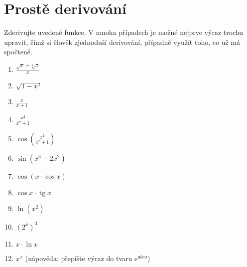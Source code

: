 \documentclass[12pt,a4paper]{article}
\DeclareMathOperator{\tg}{tg}
\def\ee{\mathrm{e}}
\begin{document}
\section*{Prostě derivování}


Zderivujte uvedené funkce. V mnoha případech je možné nejprve výraz trochu upravit, čímž si člověk zjednoduší derivování, případně využít toho, co už má spočtené.

\begin{enumerate}
	\everymath{\displaystyle}
	\parskip\bigskipamount
	\item $\frac{\sqrt x + \sqrt[3] x}{x}$
	\item $\sqrt{1-x^2}$
	\item $\frac{x}{x+1}$
	\item $\frac{x^2}{x^2+1}$
	\item $\cos\left(\frac{x^2}{x^2+1}\right)$
	\item $\sin(x^3 - 2x^2)$
	\item $\cos(x \cdot \cos x)$
	\item $\cos x \cdot \tg x$
	\item $\ln(x^2)$
	\item $(2^x)^3$
	\item $x \cdot \ln x$
	\item $x^x$ (nápověda: přepište výraz do tvaru $\ee^{\text{něco}}$)
\end{enumerate}
\end{document}
